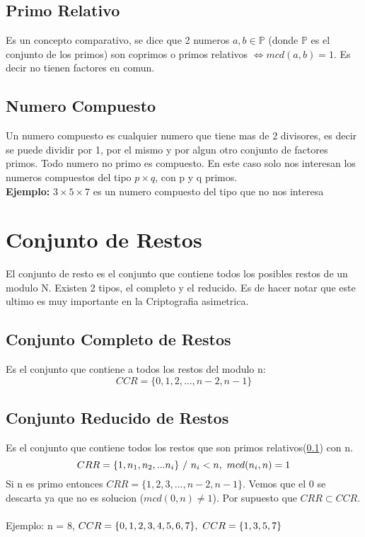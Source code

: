 \documentclass{article}
\begin{document}
\subsection{Primo Relativo}
\label{primo_relativo}
Es un concepto comparativo, se dice que 2 numeros $a, b \in \mathbb{P}$ (donde $\mathbb{P}$
es el conjunto de los primos) son coprimos o primos relativos $\iff mcd(a,b) = 1$. Es
decir no tienen factores en comun. 

\subsection{Numero Compuesto}
Un numero compuesto es cualquier numero que tiene mas de 2 divisores, es decir se puede dividir por 1, por
el mismo y por algun otro conjunto de factores primos. Todo numero no primo es compuesto. En este caso
solo nos interesan los numeros compuestos del tipo $p \times q$, con p y q primos.\\
\textbf{Ejemplo:} $3 \times 5 \times 7$ es un numero compuesto del tipo que no nos interesa

\section{Conjunto de Restos}
El conjunto de resto es el conjunto que contiene todos los posibles restos de un
modulo N. Existen 2 tipos, el completo y el reducido. Es de hacer notar que este
ultimo es muy importante en la Criptografia asimetrica.

\subsection{Conjunto Completo de Restos}
Es el conjunto que contiene a todos los restos del modulo n:
$$CCR = \{0,1,2,...,n-2,n-1\}$$

\subsection{Conjunto Reducido de Restos}
Es el conjunto que contiene todos los restos que son primos relativos(\ref{primo_relativo}) con n.
$$CRR=\{1,n_{1},n_{2},...n_{i}\} \,\, / \,\, n_{i} < n, \,\, mcd(n_{i}, n) = 1$$
Si n es primo entonces $CRR = \{1,2,3,...,n-2,n-1\}$. Vemos que el 0 se descarta
ya que no es solucion ($mcd(0, n) \neq 1$). Por supuesto que $CRR \subset CCR$.\\\\
Ejemplo: n = 8, $CCR = \{0,1,2,3,4,5,6,7\}, \,\, CCR = \{1,3,5,7\}$
\end{document}

